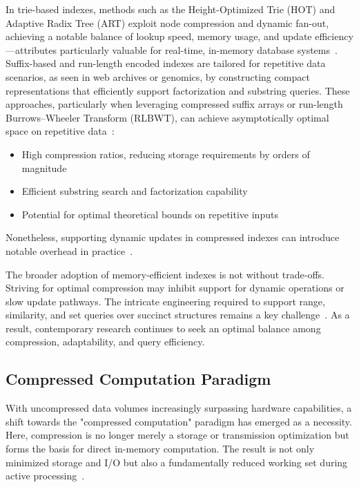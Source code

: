 \documentclass[sigconf]{acmart}
\begin{document}
In trie-based indexes, methods such as the Height-Optimized Trie (HOT) and Adaptive Radix Tree (ART) exploit node compression and dynamic fan-out, achieving a notable balance of lookup speed, memory usage, and update efficiency—attributes particularly valuable for real-time, in-memory database systems~\cite{ref87,ref106,ref109}. Suffix-based and run-length encoded indexes are tailored for repetitive data scenarios, as seen in web archives or genomics, by constructing compact representations that efficiently support factorization and substring queries. These approaches, particularly when leveraging compressed suffix arrays or run-length Burrows–Wheeler Transform (RLBWT), can achieve asymptotically optimal space on repetitive data~\cite{ref108}:
\begin{itemize}
    \item High compression ratios, reducing storage requirements by orders of magnitude
    \item Efficient substring search and factorization capability
    \item Potential for optimal theoretical bounds on repetitive inputs
\end{itemize}
Nonetheless, supporting dynamic updates in compressed indexes can introduce notable overhead in practice~\cite{ref108,ref118}.

The broader adoption of memory-efficient indexes is not without trade-offs. Striving for optimal compression may inhibit support for dynamic operations or slow update pathways. The intricate engineering required to support range, similarity, and set queries over succinct structures remains a key challenge~\cite{ref109,ref118}. As a result, contemporary research continues to seek an optimal balance among compression, adaptability, and query efficiency.

\subsection{Compressed Computation Paradigm}

With uncompressed data volumes increasingly surpassing hardware capabilities, a shift towards the "compressed computation" paradigm has emerged as a necessity. Here, compression is no longer merely a storage or transmission optimization but forms the basis for direct in-memory computation. The result is not only minimized storage and I/O but also a fundamentally reduced working set during active processing~\cite{ref118}. 
\end{document}
